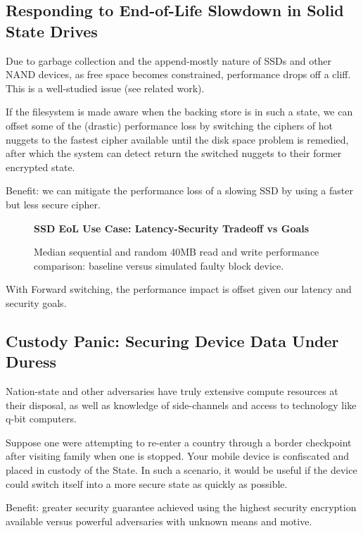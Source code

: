 \subsection{Responding to End-of-Life Slowdown in Solid State Drives}

Due to garbage collection and the append-mostly nature of SSDs and other NAND
devices, as free space becomes constrained, performance drops off a cliff. This
is a well-studied issue (see related work).

If the filesystem is made aware when the backing store is in such a state, we
can offset some of the (drastic) performance loss by switching the ciphers of
hot nuggets to the fastest cipher available until the disk space problem is
remedied, after which the system can detect return the switched nuggets to their
former encrypted state.

Benefit: we can mitigate the performance loss of a slowing SSD by using a faster
but less secure cipher.

\begin{figure}[ht] \textbf{SSD EoL Use Case: Latency-Security Tradeoff vs
   Goals}\par\medskip
   \hspace*{-1.25cm}
   {} \caption{Median sequential and
   random 40MB read and write performance comparison: baseline versus simulated
   faulty block device.}
  \label{fig:usecase-eol-tradeoff}
\end{figure}

With Forward switching, the performance impact is offset given our latency and
security goals.

\subsection{Custody Panic: Securing Device Data Under Duress}

Nation-state and other adversaries have truly extensive compute resources at
their disposal, as well as knowledge of side-channels and access to technology
like q-bit computers.

Suppose one were attempting to re-enter a country through a border checkpoint
after visiting family when one is stopped. Your mobile device is confiscated and
placed in custody of the State. In such a scenario, it would be useful if the
device could switch itself into a more secure state as quickly as possible.

Benefit: greater security guarantee achieved using the highest security
encryption available versus powerful adversaries with unknown means and motive.

